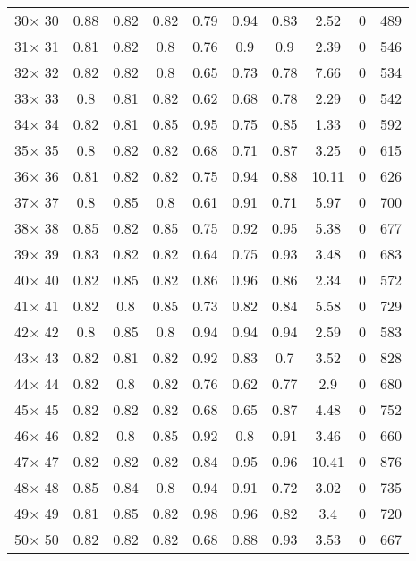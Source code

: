 \documentclass[main.tex]{subfiles}
\begin{document}
\begin{table}
\begin{tabular}{|c|c|c|c|c|c|c|c|c|c|}
30$\times$ 30 &0.88 &0.82 &0.82 &0.79 &0.94 &0.83 &2.52 &0 &489\\
31$\times$ 31 &0.81 &0.82 &0.8 &0.76 &0.9 &0.9 &2.39 &0 &546\\
32$\times$ 32 &0.82 &0.82 &0.8 &0.65 &0.73 &0.78 &7.66 &0 &534\\
33$\times$ 33 &0.8 &0.81 &0.82 &0.62 &0.68 &0.78 &2.29 &0 &542\\
34$\times$ 34 &0.82 &0.81 &0.85 &0.95 &0.75 &0.85 &1.33 &0 &592\\
35$\times$ 35 &0.8 &0.82 &0.82 &0.68 &0.71 &0.87 &3.25 &0 &615\\
36$\times$ 36 &0.81 &0.82 &0.82 &0.75 &0.94 &0.88 &10.11 &0 &626\\
37$\times$ 37 &0.8 &0.85 &0.8 &0.61 &0.91 &0.71 &5.97 &0 &700\\
38$\times$ 38 &0.85 &0.82 &0.85 &0.75 &0.92 &0.95 &5.38 &0 &677\\
39$\times$ 39 &0.83 &0.82 &0.82 &0.64 &0.75 &0.93 &3.48 &0 &683\\
40$\times$ 40 &0.82 &0.85 &0.82 &0.86 &0.96 &0.86 &2.34 &0 &572\\
41$\times$ 41 &0.82 &0.8 &0.85 &0.73 &0.82 &0.84 &5.58 &0 &729\\
42$\times$ 42 &0.8 &0.85 &0.8 &0.94 &0.94 &0.94 &2.59 &0 &583\\
43$\times$ 43 &0.82 &0.81 &0.82 &0.92 &0.83 &0.7 &3.52 &0 &828\\
44$\times$ 44 &0.82 &0.8 &0.82 &0.76 &0.62 &0.77 &2.9 &0 &680\\
45$\times$ 45 &0.82 &0.82 &0.82 &0.68 &0.65 &0.87 &4.48 &0 &752\\
46$\times$ 46 &0.82 &0.8 &0.85 &0.92 &0.8 &0.91 &3.46 &0 &660\\
47$\times$ 47 &0.82 &0.82 &0.82 &0.84 &0.95 &0.96 &10.41 &0 &876\\
48$\times$ 48 &0.85 &0.84 &0.8 &0.94 &0.91 &0.72 &3.02 &0 &735\\
49$\times$ 49 &0.81 &0.85 &0.82 &0.98 &0.96 &0.82 &3.4 &0 &720\\
50$\times$ 50 &0.82 &0.82 &0.82 &0.68 &0.88 &0.93 &3.53 &0 &667\\
    \hline
    \end{tabular}
\end{table}
\end{document}
